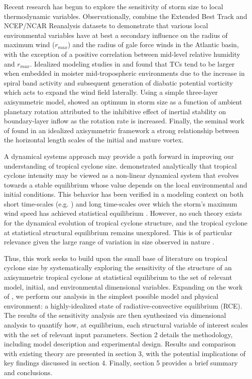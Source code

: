 \documentclass[12pt]{article}
\begin{document}
Recent research has begun to explore the sensitivity of storm size to local thermodynamic variables. Observationally, \cite{Quiring_Schumacher_Labosier_Zhu_2011} combine the Extended Best Track and NCEP/NCAR Reanalysis datasets to demonstrate that various local environmental variables have at best a secondary influence on the radius of maximum wind ($r_{max}$) and the radius of gale force winds in the Atlantic basin, with the exception of a positive correlation between mid-level relative humidity and $r_{max}$.  Idealized modeling studies in \cite{Hill_Lackmann_2009} and \cite{Xu_Wang_2010} found that TCs tend to be larger when embedded in moister mid-tropospheric environments due to the increase in spiral band activity and subsequent generation of diabatic potential vorticity which acts to expand the wind field laterally. Using a simple three-layer axisymmetric model, \cite{Smith_Schmidt_Montgomery_2011} showed an optimum in storm size as a function of ambient planetary rotation attributed to the inhibitive effect of inertial stability on boundary-layer inflow as the rotation rate is increased.  Finally, the seminal work of \cite{Rotunno_Emanuel_1987} found in an idealized axisymmetric framework a strong relationship between the horizontal length scales of the initial and mature vortex.

A dynamical systems approach may provide a path forward in improving our understanding of tropical cyclone size. \cite{Tang_Emanuel_2010} demonstrated analytically that tropical cyclone intensity may be viewed as a non-linear dynamical system that evolves towards a stable equilibrium whose value depends on the local environmental and initial conditions. This behavior has been verified in a modeling context on both short time-scales (e.g. \cite{Rotunno_Emanuel_1987}) and long time-scales over which the storm's maximum wind speed has achieved statistical equilibrium \citep{Hakim_2011}.  However, no such theory exists for the dynamical evolution of tropical cyclone structure, and the tropical cyclone at statistical structural equilibrium remains unexplored. This is of particular relevance given the large range of variation in size observed in nature \citep{Chavas_Emanuel_2010}.

Thus, this work seeks to build upon the small base of literature on tropical cyclone size by systematically exploring the sensitivity of the structure of an axisymmetric tropical cyclone at statistical equilibrium to the set of relevant model, initial, and environmental dimensional variables. Expanding on the work of \cite{Hakim_2011}, we perform our analysis in the simplest possible model and physical environment: a highly-idealized state of radiative-convective equilibrium (RCE). The results of the sensitivity analysis are then synthesized via dimensional analysis to quantify how, at equilibrium, each structural variable of interest scales with the set of relevant input parameters. Section 2 details the methodology, including model description and experimental design. Results and comparison with existing theory are presented in section 3, with the potential implications of key findings discussed in section 4. Finally, section 5 provides a brief summary and conclusions.
\end{document}
